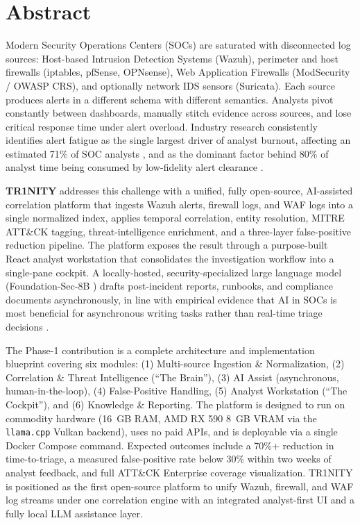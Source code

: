 \documentclass[11pt,a4paper]{article}
\begin{document}
\section{Abstract}
\label{sec:abstract}

Modern Security Operations Centers (SOCs) are saturated with disconnected log sources: Host-based Intrusion Detection Systems (Wazuh), perimeter and host firewalls (iptables, pfSense, OPNsense), Web Application Firewalls (ModSecurity / OWASP CRS), and optionally network IDS sensors (Suricata). Each source produces alerts in a different schema with different semantics. Analysts pivot constantly between dashboards, manually stitch evidence across sources, and lose critical response time under alert overload. Industry research consistently identifies alert fatigue as the single largest driver of analyst burnout, affecting an estimated 71\% of SOC analysts \cite{secure2024burnout}, and as the dominant factor behind 80\% of analyst time being consumed by low-fidelity alert clearance \cite{vmware2020soc}.

\textbf{TR1NITY} addresses this challenge with a unified, fully open-source, AI-assisted correlation platform that ingests Wazuh alerts, firewall logs, and WAF logs into a single normalized index, applies temporal correlation, entity resolution, MITRE ATT\&CK tagging, threat-intelligence enrichment, and a three-layer false-positive reduction pipeline. The platform exposes the result through a purpose-built React analyst workstation that consolidates the investigation workflow into a single-pane cockpit. A locally-hosted, security-specialized large language model (Foundation-Sec-8B \cite{cisco2025foundationsec}) drafts post-incident reports, runbooks, and compliance documents asynchronously, in line with empirical evidence that AI in SOCs is most beneficial for asynchronous writing tasks rather than real-time triage decisions \cite{darrow2024aisoc}.

The Phase-1 contribution is a complete architecture and implementation blueprint covering six modules: (1) Multi-source Ingestion \& Normalization, (2) Correlation \& Threat Intelligence (``The Brain''), (3) AI Assist (asynchronous, human-in-the-loop), (4) False-Positive Handling, (5) Analyst Workstation (``The Cockpit''), and (6) Knowledge \& Reporting. The platform is designed to run on commodity hardware (16~GB RAM, AMD RX 590 8~GB VRAM via the \texttt{llama.cpp} Vulkan backend), uses no paid APIs, and is deployable via a single Docker Compose command. Expected outcomes include a 70\%+ reduction in time-to-triage, a measured false-positive rate below 30\% within two weeks of analyst feedback, and full ATT\&CK Enterprise coverage visualization. TR1NITY is positioned as the first open-source platform to unify Wazuh, firewall, and WAF log streams under one correlation engine with an integrated analyst-first UI and a fully local LLM assistance layer.
\end{document}
